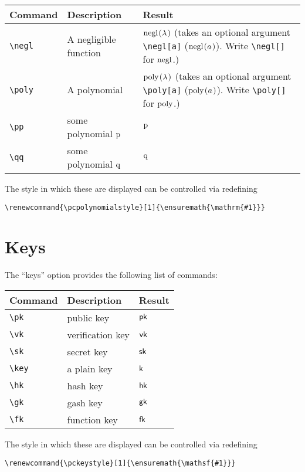 \documentclass[a4paper]{report}
\begin{document}
\begin{center}
\begin{tabular}{l l p{7.5cm}}
\textbf{Command} & \textbf{Description} & \textbf{Result} \\\hline
\lstinline$\negl$ & A negligible function & $\negl$ (takes an optional argument \lstinline$\negl[a]$ ($\negl[a]$). Write \lstinline$\negl[]$ for $\negl[]$.)  \\
\lstinline$\poly$ &  A polynomial & $\poly$ (takes an optional argument \lstinline$\poly[a]$ ($\poly[a]$). Write \lstinline$\poly[]$ for $\poly[]$.) \\
\lstinline$\pp$ & some polynomial $\pp$ & $\pp$  \\
\lstinline$\qq$ & some polynomial $\qq$ &  $\qq$  \\
\end{tabular}
\end{center}

The style in which these are displayed can be controlled via redefining
\begin{lstlisting}
\renewcommand{\pcpolynomialstyle}[1]{\ensuremath{\mathrm{#1}}}
\end{lstlisting}

\section{Keys}
The \enquote{keys} option provides the following list of commands:


\begin{center}
\begin{tabular}{l l l}
\textbf{Command} & \textbf{Description} & \textbf{Result} \\\hline
\lstinline$\pk$ &public key & $\pk$  \\
\lstinline$\vk$ &  verification key& $\vk$  \\
\lstinline$\sk$ & secret key&  $\sk$  \\
\lstinline$\key$ & a plain key& $\key$  \\
\lstinline$\hk$ & hash key&  $\hk$  \\
\lstinline$\gk$ &gash key & $\gk$  \\
\lstinline$\fk$ & function key & $\fk$
\end{tabular}
\end{center}

The style in which these are displayed can be controlled via redefining
\begin{lstlisting}
\renewcommand{\pckeystyle}[1]{\ensuremath{\mathsf{#1}}}
\end{lstlisting}
\end{document}
